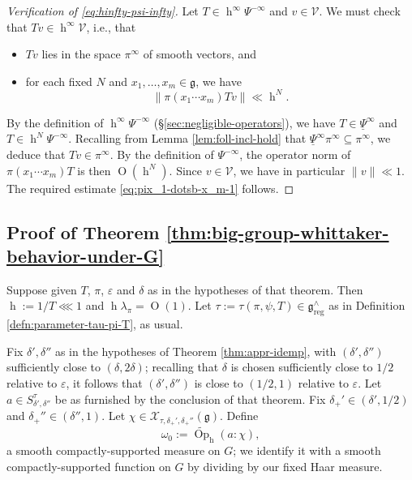 \documentclass[reqno]{amsart}
\DeclareMathOperator{\h}{h}
\def\eps{\varepsilon}
\def\O{\operatorname{O}}
\DeclareMathOperator{\Opp}{Op}
\DeclareMathOperator{\reg}{reg}
\theoremstyle{plain} \newtheorem{theorem} {Theorem}
\theoremstyle{definition} \newtheorem{definition} [theorem] {Definition}
\theoremstyle{itplain} %
\numberwithin{equation}{section}
\numberwithin{theorem}{section}
\begin{document}
\begin{proof}[Verification of \eqref{eq:hinfty-psi-infty}]
  Let $T \in \h^\infty \Psi^{-\infty}$ and $v \in \mathcal{V}$.  We must check that $T v \in \h^\infty \mathcal{V}$, i.e., that
  \begin{itemize}
  \item $T v$ lies in the space $\pi^\infty$ of smooth vectors, and
  \item for each fixed $N$ and $x_1,\dotsc,x_m \in \mathfrak{g}$, we have
  \begin{equation}\label{eq:pix_1-dotsb-x_m-1}
    \|\pi(x_1 \dotsb x_m) T v \| \ll \h^N.
  \end{equation}
\end{itemize}
By the definition of $\h^\infty \Psi^{-\infty}$ (\S\ref{sec:negligible-operators}), we have $T \in \underline{\Psi }^{\infty}$ and $T \in \h^N \Psi^{-\infty}$.  Recalling from Lemma \ref{lem:foll-incl-hold} that $\underline{\Psi }^{\infty} \pi^\infty \subseteq \pi^\infty$, we deduce that $T v \in \pi^\infty$.  By the definition of $\Psi^{-\infty}$, the operator norm of $\pi(x_1 \dotsb x_m) T$ is then $\O(\h^N)$.  Since $v \in \mathcal{V}$, we have in particular $\|v\| \ll 1$.  The required estimate \eqref{eq:pix_1-dotsb-x_m-1} follows.
\end{proof}


\subsection{Proof of Theorem \ref{thm:big-group-whittaker-behavior-under-G}}\label{sec:proof-theor-refthm:b}
Suppose given $T$, $\pi$, $\eps$ and $\delta$ as in the hypotheses of that theorem.  Then $\h := 1/T \lll 1$ and $\h \lambda_\pi = \O(1)$.  Let $\tau := \tau(\pi,\psi,T) \in \mathfrak{g}^\wedge_{\reg}$ as in Definition \ref{defn:parameter-tau-pi-T}, as usual.

Fix $\delta ', \delta ''$ as in the hypotheses of Theorem \ref{thm:appr-idemp}, with $(\delta ', \delta '')$ sufficiently close to $(\delta , 2 \delta)$; recalling that $\delta$ is chosen sufficiently close to $1/2$ relative to $\eps$, it follows that $(\delta ', \delta '')$ is close to $(1/2,1)$ relative to $\eps$.  Let $a \in S^{\tau}_{\delta ', \delta ''}$ be as furnished by the conclusion of that theorem.  Fix $\delta_+' \in (\delta ', 1/2)$ and $\delta_+'' \in (\delta '', 1)$.  Let $\chi \in \mathcal{X}_{\tau, \delta _+', \delta_+''}(\mathfrak{g})$.  Define
\begin{equation*}
\omega_0 := \widetilde{\Opp}_{\h}(a:\chi),
\end{equation*}
a smooth compactly-supported measure on $G$; we identify it with a smooth compactly-supported function on $G$ by dividing by our fixed Haar measure.
\end{document}
